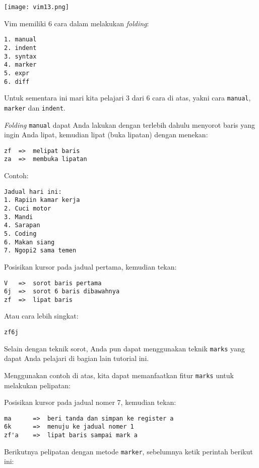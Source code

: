 \documentclass{article}
\begin{document}
\texttt{[image: vim13.png]}

\vspace{12pt}

Vim memiliki 6 cara dalam melakukan \emph{folding}:

\begin{verbatim}
1. manual
2. indent
3. syntax
4. marker
5. expr
6. diff
\end{verbatim}

Untuk sementara ini mari kita pelajari 3 dari 6 cara di
atas, yakni cara \verb=manual=, \verb=marker= dan
\verb=indent=.

\emph{Folding} \verb=manual= dapat Anda lakukan dengan
terlebih dahulu menyorot baris yang ingin Anda lipat,
kemudian lipat (buka lipatan) dengan menekan:

\begin{verbatim}
zf  =>  melipat baris
za  =>  membuka lipatan
\end{verbatim}

Contoh:

\begin{verbatim}
Jadual hari ini:
1. Rapiin kamar kerja
2. Cuci motor
3. Mandi
4. Sarapan
5. Coding
6. Makan siang
7. Ngopi2 sama temen
\end{verbatim}

Posisikan kursor pada jadual pertama, kemudian tekan:

\begin{verbatim}
V   =>  sorot baris pertama
6j  =>  sorot 6 baris dibawahnya
zf  =>  lipat baris
\end{verbatim}

Atau cara lebih singkat:

\begin{verbatim}
zf6j
\end{verbatim}

Selain dengan teknik sorot, Anda pun dapat menggunakan
teknik \verb=marks= yang dapat Anda pelajari di bagian lain
tutorial ini.

Menggunakan contoh di atas, kita dapat memanfaatkan fitur
\verb=marks= untuk melakukan pelipatan:

Posisikan kursor pada jadual nomer 7, kemudian tekan:

\begin{verbatim}
ma      =>  beri tanda dan simpan ke register a
6k      =>  menuju ke jadual nomer 1
zf'a    =>  lipat baris sampai mark a
\end{verbatim}

Berikutnya pelipatan dengan metode \verb=marker=, sebelumnya
ketik perintah berikut ini:
\end{document}
